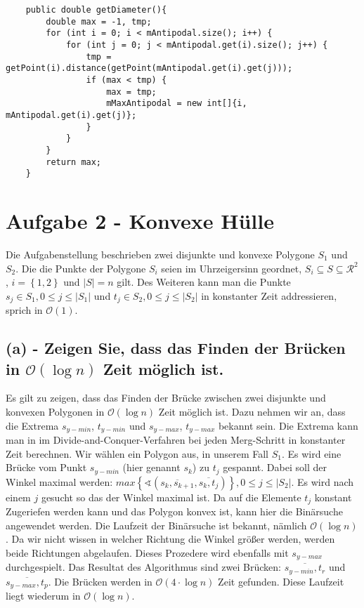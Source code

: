 \documentclass[a4paper]{article}
\begin{document}
\begin{lstlisting}
	public double getDiameter(){
        double max = -1, tmp;
        for (int i = 0; i < mAntipodal.size(); i++) {
            for (int j = 0; j < mAntipodal.get(i).size(); j++) {
                tmp = getPoint(i).distance(getPoint(mAntipodal.get(i).get(j)));
                if (max < tmp) {
                    max = tmp;
                    mMaxAntipodal = new int[]{i, mAntipodal.get(i).get(j)};
                }
            }
        }
        return max;
    }
\end{lstlisting}

\section*{Aufgabe 2 - Konvexe Hülle}

Die Aufgabenstellung beschrieben zwei disjunkte und konvexe Polygone $S_1$ und $S_2$. Die die Punkte der Polygone $S_i$ seien im Uhrzeigersinn geordnet, $S_i \subseteq S \subseteq \mathcal{R}^2$, $i = \left\{1, 2\right\}$ und $|S| = n$ gilt. Des Weiteren kann man die Punkte $s_j \in S_1, 0 \leq j \leq |S_1|$ und $t_j \in S_2, 0 \leq j \leq |S_2|$ in konstanter Zeit addressieren, sprich in $\mathcal{O}(1)$.

\subsection*{(a) - Zeigen Sie, dass das Finden der Brücken in $\mathcal{O}(\log n)$ Zeit möglich ist.}

Es gilt zu zeigen, dass das Finden der Brücke zwischen zwei disjunkte und konvexen Polygonen in $\mathcal{O}(\log n)$ Zeit möglich ist. Dazu nehmen wir an, dass die Extrema $s_{y-min}$, $t_{y-min}$ und $s_{y-max}$, $t_{y-max}$ bekannt sein. Die Extrema kann man in im Divide-and-Conquer-Verfahren bei jeden Merg-Schritt in konstanter Zeit berechnen. Wir wählen ein Polygon aus, in unserem Fall $S_1$. Es wird eine Brücke vom Punkt $s_{y-min}$ (hier genannt $s_k$) zu $t_j$ gespannt. Dabei soll der Winkel maximal werden: $max \left\{\sphericalangle \left(\overline{s_k,s_{k+1}},\overline{s_k,t_j}\right)\right\}, 0 \leq j \leq |S_2|$. Es wird nach einem $j$ gesucht so das der Winkel maximal ist. Da auf die Elemente $t_j$ konstant Zugeriefen werden kann und das Polygon konvex ist, kann hier die Binärsuche angewendet werden. Die Laufzeit der Binärsuche ist bekannt, nämlich $\mathcal{O}(\log n)$. Da wir nicht wissen in welcher Richtung die Winkel größer werden, werden beide Richtungen abgelaufen. Dieses Prozedere wird ebenfalls mit $s_{y-max}$ durchgespielt. Das Resultat des Algorithmus sind zwei Brücken: $\overline{s_{y-min}, t_r}$ und $\overline{s_{y-max}, t_p}$. Die Brücken werden in $\mathcal{O}(4 \cdot \log n)$ Zeit gefunden. Diese Laufzeit liegt wiederum in $\mathcal{O}(\log n)$.
\end{document}
